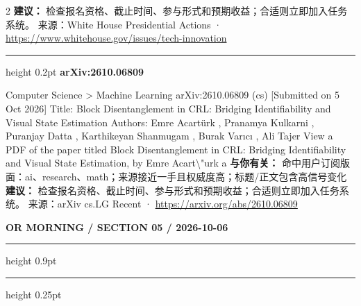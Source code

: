 \documentclass[10.5pt]{ctexart}
\begin{document}
\begin{multicols}{2}
\textbf{建议：} 检查报名资格、截止时间、参与形式和预期收益；合适则立即加入任务系统。
{\footnotesize\color{ormuted} 来源：White House Presidential Actions · \url{https://www.whitehouse.gov/issues/tech-innovation}}
\vspace{2mm}
\hrule height 0.2pt
\vspace{2mm}
{\large\bfseries arXiv:2610.06809}\par
Computer Science > Machine Learning arXiv:2610.06809 (cs) [Submitted on 5 Oct 2026] Title: Block Disentanglement in CRL: Bridging Identifiability and Visual State Estimation Authors: Emre Acartürk , Pranamya Kulkarni , Puranjay Datta , Karthikeyan Shanmugam , Burak Varıcı , Ali Tajer View a PDF of the paper titled Block Disentanglement in CRL: Bridging Identifiability and Visual State Estimation, by Emre Acart\textbackslash{}"urk a
\textbf{与你有关：} 命中用户订阅版面：ai、research、math；来源接近一手且权威度高；标题/正文包含高信号变化
\textbf{建议：} 检查报名资格、截止时间、参与形式和预期收益；合适则立即加入任务系统。
{\footnotesize\color{ormuted} 来源：arXiv cs.LG Recent · \url{https://arxiv.org/abs/2610.06809}}
\end{multicols}
\newpage
{\small\bfseries OR MORNING / SECTION 05 / 2026-10-06}
\vspace{2mm}
\hrule height 0.9pt
\vspace{1.5mm}
\hrule height 0.25pt
\vspace{4mm}
\end{document}
